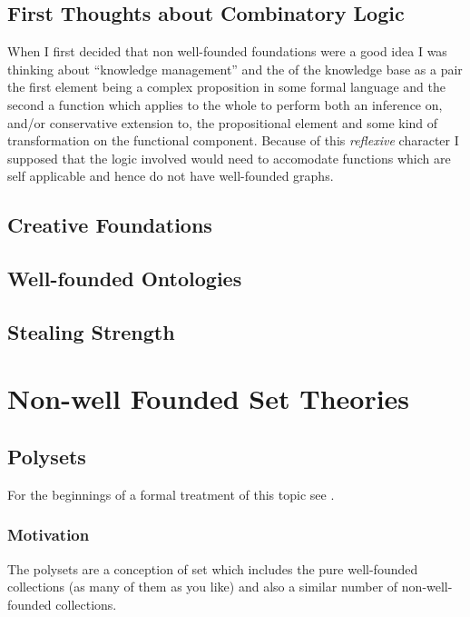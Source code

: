 \documentclass[numreferences]{rbjk}
\begin{document}
\begin{article}
\subsection{First Thoughts about Combinatory Logic}

When I first decided that non well-founded foundations were a good idea I was thinking about ``knowledge management'' and the of the knowledge base as a pair the first element being a complex proposition in some formal language and the second a function which applies to the whole to perform both an inference on, and/or conservative extension to, the propositional element and some kind of transformation on the functional component.
Because of this \emph{reflexive} character I supposed that the logic involved would need to accomodate functions which are self applicable and hence do not have well-founded graphs.


\subsection{Creative Foundations}

\subsection{Well-founded Ontologies}



\subsection{Stealing Strength}

\section{Non-well Founded Set Theories}


\subsection{Polysets}

For the beginnings of a formal treatment of this topic see \cite{rbjt020}.

\subsubsection{Motivation}

The polysets are a conception of set which includes the pure well-founded collections (as many of them as you like) and also a similar number of non-well-founded collections.


\end{article}
\end{document}
